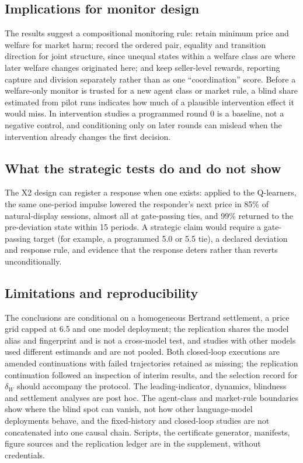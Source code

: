 \documentclass[sigconf,review,anonymous]{acmart}
\begin{document}
\subsection{Implications for monitor design}

The results suggest a compositional monitoring rule: retain minimum price and welfare for market harm; record the ordered pair, equality and transition direction for joint structure, since unequal states within a welfare class are where later welfare changes originated here; and keep seller-level rewards, reporting capture and division separately rather than as one ``coordination'' score. Before a welfare-only monitor is trusted for a new agent class or market rule, a blind share estimated from pilot runs indicates how much of a plausible intervention effect it would miss. In intervention studies a programmed round 0 is a baseline, not a negative control, and conditioning only on later rounds can mislead when the intervention already changes the first decision.

\subsection{What the strategic tests do and do not show}

The X2 design can register a response when one exists: applied to the Q-learners, the same one-period impulse lowered the responder's next price in 85\% of natural-display sessions, almost all at gate-passing ties, and 99\% returned to the pre-deviation state within 15 periods. A strategic claim would require a gate-passing target (for example, a programmed 5.0 or 5.5 tie), a declared deviation and response rule, and evidence that the response deters rather than reverts unconditionally.

\subsection{Limitations and reproducibility}

The conclusions are conditional on a homogeneous Bertrand settlement, a price grid capped at 6.5 and one model deployment; the replication shares the model alias and fingerprint and is not a cross-model test, and studies with other models used different estimands and are not pooled. Both closed-loop executions are amended continuations with failed trajectories retained as missing; the replication continuation followed an inspection of interim results, and the selection record for $\delta_W$ should accompany the protocol. The leading-indicator, dynamics, blindness and settlement analyses are post hoc. The agent-class and market-rule boundaries show where the blind spot can vanish, not how other language-model deployments behave, and the fixed-history and closed-loop studies are not concatenated into one causal chain. Scripts, the certificate generator, manifests, figure sources and the replication ledger are in the supplement, without credentials.
\end{document}
